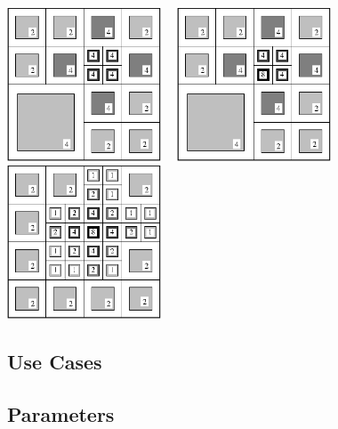 \centerline{\includegraphics[width=1.8in]{amr2-8.eps} \ \
            \includegraphics[width=1.8in]{amr2-9.eps} \ \
            \includegraphics[width=1.8in]{amr2-11.eps}}

\subsection{Use Cases}
\subsection{Parameters}
